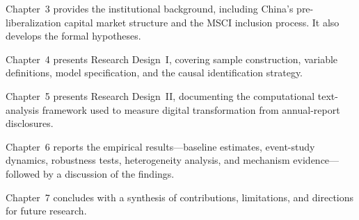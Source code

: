 Chapter~3 provides the institutional background, including China's pre-liberalization capital market structure and the MSCI inclusion process. It also develops the formal hypotheses.

Chapter~4 presents Research Design~I, covering sample construction, variable definitions, model specification, and the causal identification strategy.

Chapter~5 presents Research Design~II, documenting the computational text-analysis framework used to measure digital transformation from annual-report disclosures.

Chapter~6 reports the empirical results---baseline estimates, event-study dynamics, robustness tests, heterogeneity analysis, and mechanism evidence---followed by a discussion of the findings.

Chapter~7 concludes with a synthesis of contributions, limitations, and directions for future research.
